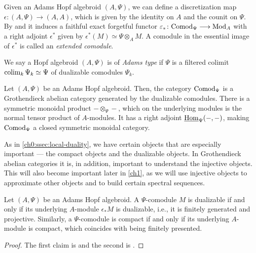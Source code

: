 \begin{construction}
    Given an Adams Hopf algebroid $(A, \Psi)$, we can define a discretization map $\epsilon\colon (A, \Psi)\longrightarrow (A, A)$, which is given by the identity on $A$ and the counit on $\Psi$. By \cite[A1.2.1]{ravenel_86} and \cite[4.6]{barthel-heard-valenzuela_2018} it induces a faithful exact forgetful functor $\varepsilon_* \colon \mathrm{Comod}_\Psi \longrightarrow \mathrm{Mod}_A$ with a right adjoint $\epsilon^*$ given by $\epsilon^*(M)\simeq \Psi\otimes_A M$. A comodule in the essential image of $\epsilon^*$ is called an \emph{extended comodule}. 
\end{construction}

\begin{definition}
    \label{ch0:def:adams-hopf-algebroid}
    We say a Hopf algebroid $(A, \Psi)$ is of \emph{Adams type} if $\Psi$ is a filtered colimit $\operatorname{colim}_k \Psi_k \simeq \Psi$ of dualizable comodules $\Psi_k$.
\end{definition}

\begin{proposition}
    \label{ch0:prop:comod-is-sm-grothendieck}
    Let $(A,\Psi)$ be an Adams Hopf algebroid. Then, the category $\mathrm{Comod}_\Psi$ is a Grothendieck abelian category generated by the dualizable comodules. There is a symmetric monoidal product $-\otimes_\Psi -$, which on the underlying modules is the normal tensor product of $A$-modules. It has a right adjoint $\operatorname{\underline{Hom}}_\Psi(-,-)$, making $\mathrm{Comod}_\Psi$ a closed symmetric monoidal category. 
\end{proposition}

As in \cref{ch0:ssec:local-duality}, we have certain objects that are especially important --- the compact objects and the dualizable objects. In Grothendieck abelian categories it is, in addition, important to understand the injective objects. This will also become important later in \cref{ch1}, as we will use injective objects to approximate other objects and to build certain spectral sequences.  

\begin{proposition}
    \label{ch0:rm:dualizable/compact-comodules}
    Let $(A, \Psi)$ be an Adams Hopf algebroid. A $\Psi$-comodule $M$ is dualizable if and only if its underlying $A$-module $\epsilon_* M$ is dualizable, i.e., it is finitely generated and projective. Similarly, a $\Psi$-comodule is compact if and only if its underlying $A$-module is compact, which coincides with being finitely presented. 
\end{proposition}
\begin{proof}
    The first claim is \cite[1.3.4]{hovey_04} and the second is \cite[1.4.2]{hovey_04}. 
\end{proof}

